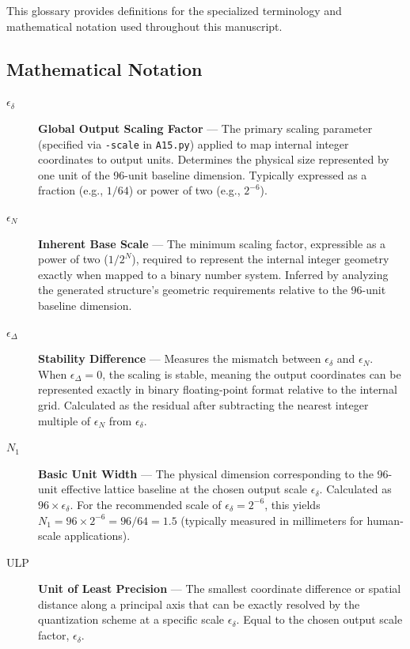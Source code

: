\documentclass[10pt]{article}
\begin{document}
This glossary provides definitions for the specialized terminology and mathematical notation used throughout this manuscript.

\subsection{Mathematical Notation}
\label{subsec-glossary-notation}

\begin{description}
    \item[$\epsilon_\delta$] \textbf{Global Output Scaling Factor} — The primary scaling parameter (specified via \texttt{-scale} in \texttt{A15.py}) applied to map internal integer coordinates to output units. Determines the physical size represented by one unit of the 96-unit baseline dimension. Typically expressed as a fraction (e.g., $1/64$) or power of two (e.g., $2^{-6}$).

    \item[$\epsilon_N$] \textbf{Inherent Base Scale} — The minimum scaling factor, expressible as a power of two ($1/2^N$), required to represent the internal integer geometry exactly when mapped to a binary number system. Inferred by analyzing the generated structure's geometric requirements relative to the 96-unit baseline dimension.

    \item[$\epsilon_\Delta$] \textbf{Stability Difference} — Measures the mismatch between $\epsilon_\delta$ and $\epsilon_N$. When $\epsilon_\Delta = 0$, the scaling is stable, meaning the output coordinates can be represented exactly in binary floating-point format relative to the internal grid. Calculated as the residual after subtracting the nearest integer multiple of $\epsilon_N$ from $\epsilon_\delta$.

    \item[$N_1$] \textbf{Basic Unit Width} — The physical dimension corresponding to the 96-unit effective lattice baseline at the chosen output scale $\epsilon_\delta$. Calculated as $96 \times \epsilon_\delta$. For the recommended scale of $\epsilon_\delta = 2^{-6}$, this yields $N_1 = 96 \times 2^{-6} = 96/64 = 1.5$ (typically measured in millimeters for human-scale applications).

    \item[ULP] \textbf{Unit of Least Precision} — The smallest coordinate difference or spatial distance along a principal axis that can be exactly resolved by the quantization scheme at a specific scale $\epsilon_\delta$. Equal to the chosen output scale factor, $\epsilon_\delta$.
\end{description}
\end{document}
